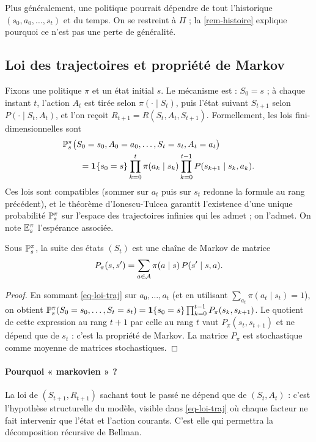 Plus généralement, une politique pourrait dépendre de tout l'historique $(s_0,a_0,\dots,s_t)$ et du temps. On se restreint à $\Pi$ ; la \cref{rem-histoire} explique pourquoi ce n'est pas une perte de généralité.

\subsection{Loi des trajectoires et propriété de Markov}

Fixons une politique $\pi$ et un état initial $s$. Le mécanisme est : $S_0=s$ ; à chaque instant $t$, l'action $A_t$ est tirée selon $\pi(\cdot\mid S_t)$, puis l'état suivant $S_{t+1}$ selon $P(\cdot\mid S_t,A_t)$, et l'on reçoit $R_{t+1}=R(S_t,A_t,S_{t+1})$. Formellement, les lois fini-dimensionnelles sont
\begin{equation}\label{eq-loi-traj}
\begin{split}
&\P^\pi_s\big(S_0=s_0,A_0=a_0,\dots,S_t=s_t,A_t=a_t\big)\\
&\qquad=\1\{s_0=s\}\prod_{k=0}^{t}\pi(a_k\mid s_k)\prod_{k=0}^{t-1}P(s_{k+1}\mid s_k,a_k).
\end{split}
\end{equation}
Ces lois sont compatibles (sommer sur $a_t$ puis sur $s_t$ redonne la formule au rang précédent), et le théorème d'Ionescu-Tulcea garantit l'existence d'une unique probabilité $\P^\pi_s$ sur l'espace des trajectoires infinies qui les admet ; on l'admet. On note $\E^\pi_s$ l'espérance associée.

\begin{proposition}\label{prop-chaine-induite}
Sous $\P^\pi_s$, la suite des états $(S_t)$ est une chaîne de Markov de matrice
\[
P_\pi(s,s')=\sum_{a\in\cA}\pi(a\mid s)\,P(s'\mid s,a).
\]
\end{proposition}
\begin{proof}
En sommant \eqref{eq-loi-traj} sur $a_0,\dots,a_{t}$ (et en utilisant $\sum_{a_t}\pi(a_t\mid s_t)=1$), on obtient $\P^\pi_s(S_0=s_0,\dots,S_t=s_t)=\1\{s_0=s\}\prod_{k=0}^{t-1}P_\pi(s_k,s_{k+1})$. Le quotient de cette expression au rang $t+1$ par celle au rang $t$ vaut $P_\pi(s_t,s_{t+1})$ et ne dépend que de $s_t$ : c'est la propriété de Markov. La matrice $P_\pi$ est stochastique comme moyenne de matrices stochastiques.
\end{proof}

\paragraph{Pourquoi « markovien » ?} La loi de $(S_{t+1},R_{t+1})$ sachant tout le passé ne dépend que de $(S_t,A_t)$ : c'est l'hypothèse structurelle du modèle, visible dans \eqref{eq-loi-traj} où chaque facteur ne fait intervenir que l'état et l'action courants. C'est elle qui permettra la décomposition récursive de Bellman.

